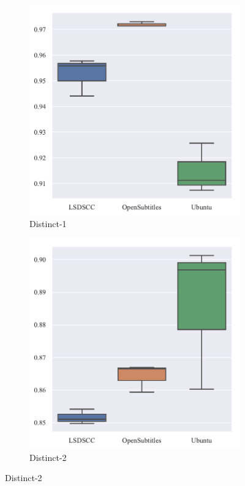 \begin{figure}[H]
    \begin{subfigure}{0.5\linewidth}
        \centering
        \includegraphics[width=0.8\linewidth]{figure/boxplot/dataset/distinct_1/plot.pdf}
        \caption{Distinct-1}
        \label{fig:distinct_1_dataset}
    \end{subfigure}%
    \begin{subfigure}{0.5\linewidth}
        \centering
        \includegraphics[width=0.8\linewidth]{figure/boxplot/dataset/distinct_2/plot.pdf}
        \caption{Distinct-2}
        \label{fig:distinct_2_dataset}
    \end{subfigure}


\end{figure}
